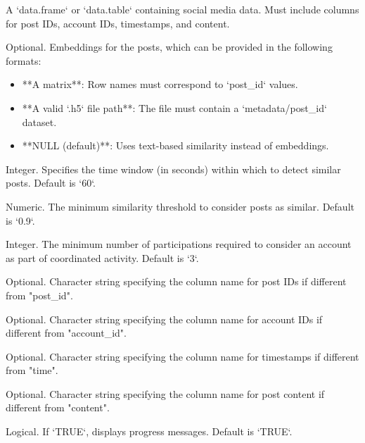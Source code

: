 \documentclass[a4paper]{book}
\begin{document}
\begin{Arguments}
\begin{ldescription}
\item[\code{data}] A `data.frame` or `data.table` containing social media data. Must include columns for post IDs, account IDs, timestamps, and content.

\item[\code{embeddings}] Optional. Embeddings for the posts, which can be provided in the following formats:
\begin{itemize}

\item{} **A matrix**: Row names must correspond to `post\_id` values.
\item{} **A valid `.h5` file path**: The file must contain a `metadata/post\_id` dataset.
\item{} **NULL (default)**: Uses text-based similarity instead of embeddings.

\end{itemize}


\item[\code{time\_window}] Integer. Specifies the time window (in seconds) within which to detect similar posts. Default is `60`.

\item[\code{min\_simil}] Numeric. The minimum similarity threshold to consider posts as similar. Default is `0.9`.

\item[\code{min\_participation}] Integer. The minimum number of participations required to consider an account as part of coordinated activity. Default is `3`.

\item[\code{post\_id}] Optional. Character string specifying the column name for post IDs if different from "post\_id".

\item[\code{account\_id}] Optional. Character string specifying the column name for account IDs if different from "account\_id".

\item[\code{time}] Optional. Character string specifying the column name for timestamps if different from "time".

\item[\code{content}] Optional. Character string specifying the column name for post content if different from "content".

\item[\code{verbose}] Logical. If `TRUE`, displays progress messages. Default is `TRUE`.


\end{ldescription}
\end{Arguments}
\end{document}
